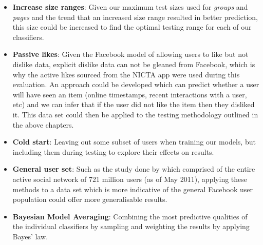 \begin{itemize}
\item \textbf{Increase size ranges}: Given our maximum test sizes used for \emph{groups} and \emph{pages} and the trend that an increased
size range resulted in better prediction, this size could be 
increased to find the optimal testing range for each of our classifiers.
\item \textbf{Passive likes}: Given the Facebook model of allowing users to like but not dislike data, explicit dislike data can not be 
gleaned from Facebook, which is why the active likes sourced from the NICTA app were used during this evaluation. An approach could be developed 
which can predict whether a user will have seen an item (online timestamps, recent interactions with a user, etc) and we can infer that if the 
user did not like the item then they disliked it. This data set could then be applied to the testing methodology outlined in the above chapters.
\item \textbf{Cold start}: Leaving out some subset of users when training our models, but including them during testing to explore their 
effects on results.
\item \textbf{General user set}: Such as the study done by \cite{jugand} which comprised of the entire active social network of 721 million users 
(as of May 2011), applying these methods to a data set which is more indicative of the general Facebook user population could offer more 
generalisable results.
\item \textbf{Bayesian Model Averaging}: Combining the most predictive qualities of the individual classifiers by sampling and
weighting the results by applying Bayes' law.
\end{itemize}

